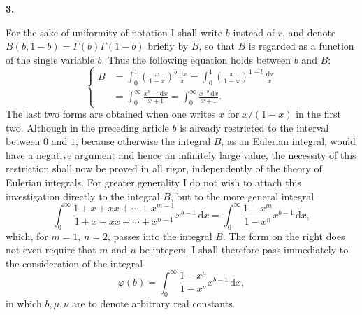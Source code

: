 \documentclass[11pt]{article}
\newcommand{\dd}{\,\mathrm d}
\newcommand{\art}[1]{\bigskip\begin{center}\large\bfseries #1.\end{center}\nopagebreak}
\begin{document}
\art{3}

For the sake of uniformity of notation I shall write $b$ instead of $r$, and denote $B(b,1-b)=\Gamma(b)\Gamma(1-b)$ briefly by $B$, so that $B$ is regarded as a function of the single variable $b$. Thus the following equation holds between $b$ and $B$:
\begin{equation}
\left\{
\begin{aligned}
B&=\int_0^1 \left(\frac{x}{1-x}\right)^b\frac{\dd x}{x}
  =\int_0^1 \left(\frac{x}{1-x}\right)^{1-b}\frac{\dd x}{x} \\
&=\int_0^\infty \frac{x^{b-1}\dd x}{x+1}
  =\int_0^\infty \frac{x^{-b}\dd x}{x+1}.
\end{aligned}
\right.
\tag{8}
\end{equation}
The last two forms are obtained when one writes $x$ for $x/(1-x)$ in the first two. Although in the preceding article $b$ is already restricted to the interval between $0$ and $1$, because otherwise the integral $B$, as an Eulerian integral, would have a negative argument and hence an infinitely large value, the necessity of this restriction shall now be proved in all rigor, independently of the theory of Eulerian integrals. For greater generality I do not wish to attach this investigation directly to the integral $B$, but to the more general integral
\[
\int_0^\infty \frac{1+x+xx+\cdots+x^{m-1}}{1+x+xx+\cdots+x^{n-1}}x^{b-1}\dd x
=\int_0^\infty \frac{1-x^m}{1-x^n}x^{b-1}\dd x,
\]
which, for $m=1$, $n=2$, passes into the integral $B$. The form on the right does not even require that $m$ and $n$ be integers. I shall therefore pass immediately to the consideration of the integral
\begin{equation}
\varphi(b)=\int_0^\infty \frac{1-x^\mu}{1-x^\nu}x^{b-1}\dd x,
\tag{9}
\end{equation}
in which $b,\mu,\nu$ are to denote arbitrary real constants.
\end{document}
